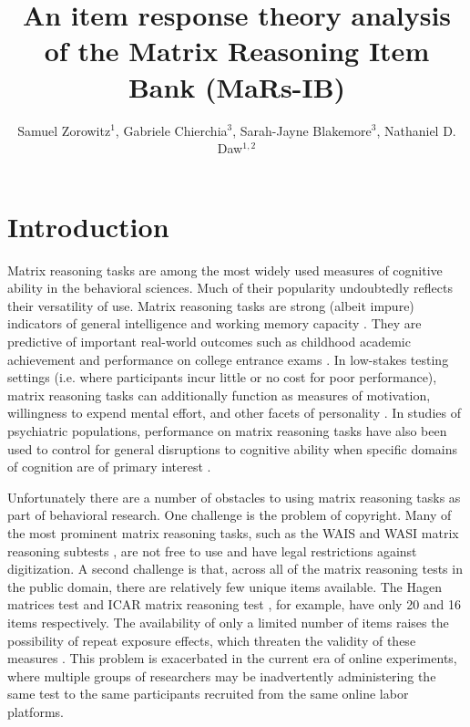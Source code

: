 \documentclass[a4paper,man,natbib,noextraspace]{apa6}
\title{An item response theory analysis of the Matrix Reasoning Item Bank (MaRs-IB)}
\author{Samuel Zorowitz$^1$, Gabriele Chierchia$^3$, Sarah-Jayne Blakemore$^3$, Nathaniel D. Daw$^{1,2}$}
\affiliation{$^1$Princeton Neuroscience Institute, Princeton University, USA\\$^2$Department of Psychology, Princeton University, USA\\$^3$Department of Psychology, University of Cambridge, Downing Street, Cambridge, UK}
\begin{document}
\maketitle

\section{Introduction}

Matrix reasoning tasks are among the most widely used measures of cognitive ability in the behavioral sciences. Much of their popularity undoubtedly reflects their versatility of use. Matrix reasoning tasks are strong (albeit impure) indicators of general intelligence \citep{gignac2015raven} and working memory capacity \citep{kane2004generality, unsworth2005working}. They are predictive of important real-world outcomes such as childhood academic achievement \citep{roth2015intelligence} and performance on college entrance exams \citep{frey2004scholastic, koenig2008act}. In low-stakes testing settings (i.e. where participants incur little or no cost for poor performance), matrix reasoning tasks can additionally function as measures of motivation, willingness to expend mental effort, and other facets of personality \citep{duckworth2011role, gignac2019maximum}. In studies of psychiatric populations, performance on matrix reasoning tasks have also been used to control for general disruptions to cognitive ability when specific domains of cognition are of primary interest \citep{gillan2016characterizing, rouault2018psychiatric, moutoussis2021decision}.

Unfortunately there are a number of obstacles to using matrix reasoning tasks as part of behavioral research. One challenge is the problem of copyright. Many of the most prominent matrix reasoning tasks, such as the WAIS and WASI matrix reasoning subtests \citep{wechsler1999wechsler, corporation2008wechsler}, are not free to use and have legal restrictions against digitization. A second challenge is that, across all of the matrix reasoning tests in the public domain, there are relatively few unique items available. The Hagen matrices test \citep{heydasch2014hagen} and ICAR matrix reasoning test \citep{condon2014international}, for example, have only 20 and 16 items respectively. The availability of only a limited number of items raises the possibility of repeat exposure effects, which threaten the validity of these measures  \citep{ng1974applicability, bors2003effect}. This problem is exacerbated in the current era of online experiments, where multiple groups of researchers may be inadvertently administering the same test to the same participants recruited from the same online labor platforms.
\end{document}
